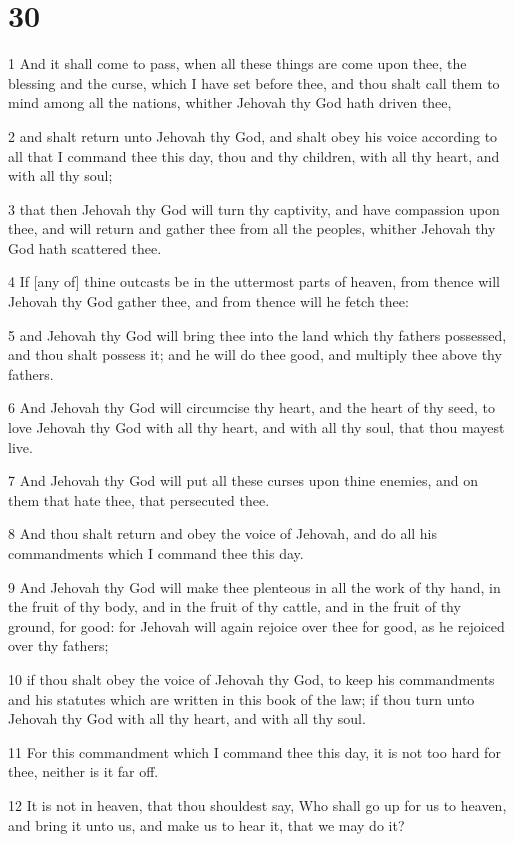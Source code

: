 \chapter{30}

\par 1 And it shall come to pass, when all these things are come upon thee, the blessing and the curse, which I have set before thee, and thou shalt call them to mind among all the nations, whither Jehovah thy God hath driven thee,
\par 2 and shalt return unto Jehovah thy God, and shalt obey his voice according to all that I command thee this day, thou and thy children, with all thy heart, and with all thy soul;
\par 3 that then Jehovah thy God will turn thy captivity, and have compassion upon thee, and will return and gather thee from all the peoples, whither Jehovah thy God hath scattered thee.
\par 4 If [any of] thine outcasts be in the uttermost parts of heaven, from thence will Jehovah thy God gather thee, and from thence will he fetch thee:
\par 5 and Jehovah thy God will bring thee into the land which thy fathers possessed, and thou shalt possess it; and he will do thee good, and multiply thee above thy fathers.
\par 6 And Jehovah thy God will circumcise thy heart, and the heart of thy seed, to love Jehovah thy God with all thy heart, and with all thy soul, that thou mayest live.
\par 7 And Jehovah thy God will put all these curses upon thine enemies, and on them that hate thee, that persecuted thee.
\par 8 And thou shalt return and obey the voice of Jehovah, and do all his commandments which I command thee this day.
\par 9 And Jehovah thy God will make thee plenteous in all the work of thy hand, in the fruit of thy body, and in the fruit of thy cattle, and in the fruit of thy ground, for good: for Jehovah will again rejoice over thee for good, as he rejoiced over thy fathers;
\par 10 if thou shalt obey the voice of Jehovah thy God, to keep his commandments and his statutes which are written in this book of the law; if thou turn unto Jehovah thy God with all thy heart, and with all thy soul.
\par 11 For this commandment which I command thee this day, it is not too hard for thee, neither is it far off.
\par 12 It is not in heaven, that thou shouldest say, Who shall go up for us to heaven, and bring it unto us, and make us to hear it, that we may do it?
